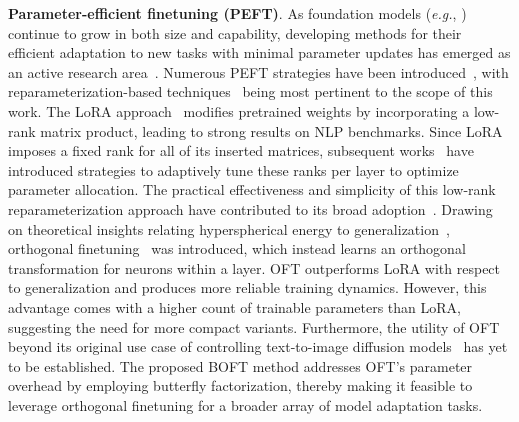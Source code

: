 \textbf{Parameter-efficient finetuning (PEFT)}. As foundation models (\emph{e.g.}, \cite{brown2020language,radford2021learning,rombach2022high,kirillov2023segment}) continue to grow in both size and capability, developing methods for their efficient adaptation to new tasks with minimal parameter updates has emerged as an active research area~\cite{treviso2023efficient,ding2023parameter,lialin2023scaling}. Numerous PEFT strategies have been introduced~\cite{houlsby2019parameter,aghajanyan2020intrinsic,hulora2022,edalati2022krona,wang2022adamix,gheini2021cross,zaken2022bitfit,guo2020parameter,sung2021training,ansell2022composable,lester2021power,li2021prefix,vu2022spot,he2021towards,mao2021unipelt,karimi2021compacter,liu2022few,sung2022lst,chen2022parameter,jia2022visual,chen2022adaptformer,zhang2022neural,jie2023fact,lian2022scaling,luo2023towards}, with reparameterization-based techniques~\cite{aghajanyan2020intrinsic,hulora2022,edalati2022krona} being most pertinent to the scope of this work. The LoRA approach~\cite{hulora2022} modifies pretrained weights by incorporating a low-rank matrix product, leading to strong results on NLP benchmarks. Since LoRA imposes a fixed rank for all of its inserted matrices, subsequent works~\cite{zhang2022adaptive,valipour2022dylora,zhang2023increlora} have introduced strategies to adaptively tune these ranks per layer to optimize parameter allocation. The practical effectiveness and simplicity of this low-rank reparameterization approach have contributed to its broad adoption~\cite{dettmers2023qlora,zi2023delta,chavan2023one}. Drawing on theoretical insights relating hyperspherical energy to generalization~\cite{liu2018learning,liu2021orthogonal}, orthogonal finetuning~\cite{qiu2023controlling} was introduced, which instead learns an orthogonal transformation for neurons within a layer. OFT outperforms LoRA with respect to generalization and produces more reliable training dynamics. However, this advantage comes with a higher count of trainable parameters than LoRA, suggesting the need for more compact variants. Furthermore, the utility of OFT beyond its original use case of controlling text-to-image diffusion models~\cite{qiu2023controlling} has yet to be established. The proposed BOFT method addresses OFT’s parameter overhead by employing butterfly factorization, thereby making it feasible to leverage orthogonal finetuning for a broader array of model adaptation tasks.

